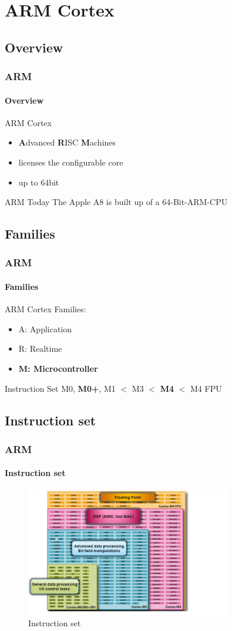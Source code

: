 \section{ARM Cortex}
\subsection{Overview}
\begin{frame}
    \frametitle{ARM}
    \framesubtitle{Overview}
    ARM Cortex
    \begin{itemize}
        \item \textbf{A}dvanced \textbf{R}ISC \textbf{M}achines
        \item licenses the configurable core
        \item up to 64bit
    \end{itemize}
    \begin{block}{ARM Today}
		The Apple A8 is built up of a 64-Bit-ARM-CPU
    \end{block}
\end{frame}

\subsection{Families}
\begin{frame}
    \frametitle{ARM}
    \framesubtitle{Families}
   ARM Cortex Families:
    \begin{itemize}
        \item A: Application
        \item R: Realtime
        \item \textbf{M: Microcontroller}
    \end{itemize}
    \begin{block}{Instruction Set}
       M0,\textbf{ M0+}, M1 $<$  M3 $<$  \textbf{M4} $<$ M4 FPU
    \end{block}
\end{frame}

\subsection{Instruction set}
\begin{frame}
    \frametitle{ARM}
    \framesubtitle{Instruction set}
    \begin{figure}
        \includegraphics[width=0.8\textwidth]			{fig/instructionset.png}
        \caption{Instruction set}
    \end{figure}
\end{frame}

